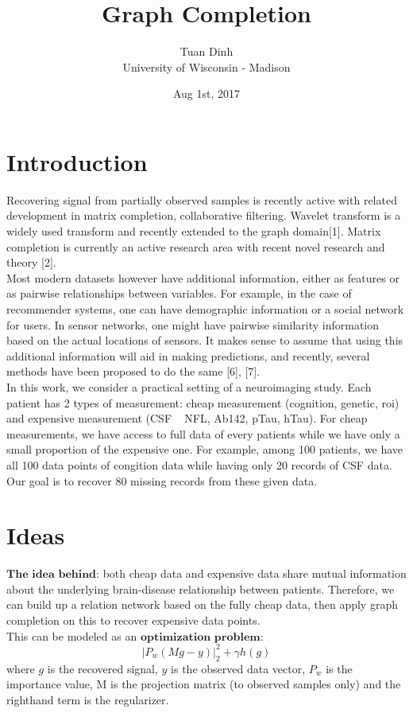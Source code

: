 \documentclass{article}
\title{Graph Completion}
\date{Aug 1st, 2017}
\author{Tuan Dinh\\ University of Wisconsin - Madison}
\theoremstyle{definition}
\begin{document}
\maketitle

\hrulefill

\section{Introduction}
Recovering signal from partially observed samples is recently active with related development in matrix completion, collaborative filtering. Wavelet transform is a widely used transform and recently extended to the graph domain[1]. Matrix completion is currently an active research area with recent novel research and theory [2].\\
Most modern datasets however have additional information, either
as features or as pairwise relationships between variables. For example, in the case of recommender systems, one can have demographic information or a social network for users. In sensor networks, one might have pairwise similarity information based on the actual locations of sensors. It makes sense to assume that using this additional information will aid in making predictions, and recently, several methods have been proposed to do the same [6], [7]. \\
In this work, we consider a practical setting of a neuroimaging study. Each patient has 2 types of measurement: cheap measurement (cognition, genetic, roi) and expensive measurement (CSF ~ NFL, Ab142, pTau, hTau). For cheap measurements, we have access to full data of every patients while we have only a small proportion of the expensive one. For example, among 100 patients, we have all 100 data points of congition data while having only 20 records of CSF data.
Our goal is to recover 80 missing records from these given data.

\section{Ideas}
$\textbf{The idea behind}$: both cheap data and expensive data share mutual information about the underlying brain-disease relationship between patients. Therefore, we can build up a relation network based on the fully cheap data, then apply graph completion on this to recover expensive data points. \\

This can be modeled as an $\textbf{optimization problem}$: 
$$|P_{w}(Mg - y)|_{2}^{2} + \gamma h(g)$$ 
where $\textit{g}$ is the recovered signal, $\textit{y}$ is the observed data vector, $P_{w}$ is the importance value, M is the projection matrix (to observed samples only) and the righthand term is the regularizer.\\
\end{document}
